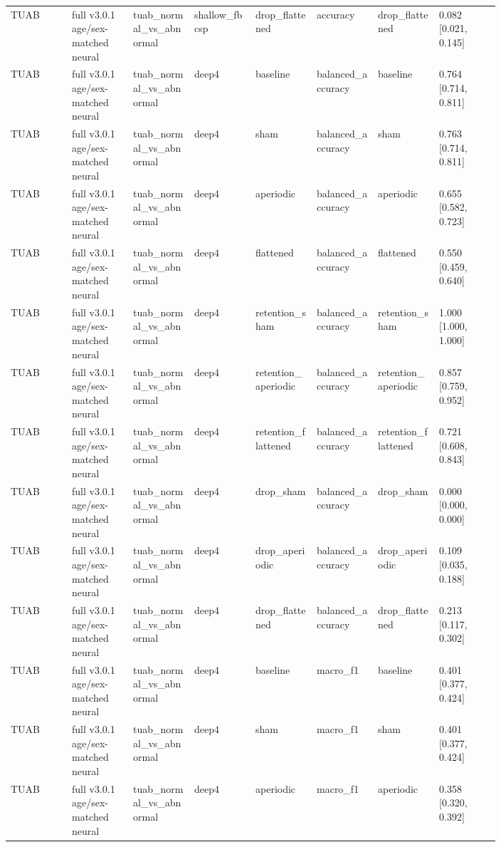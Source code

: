 \begin{longtable}{p{0.10\linewidth}p{0.10\linewidth}p{0.10\linewidth}p{0.10\linewidth}p{0.10\linewidth}p{0.10\linewidth}p{0.10\linewidth}p{0.10\linewidth}}
TUAB & full v3.0.1 age/sex-matched neural & tuab\_normal\_vs\_abnormal & shallow\_fbcsp & drop\_flattened & accuracy & drop\_flattened & 0.082 [0.021, 0.145]\\
TUAB & full v3.0.1 age/sex-matched neural & tuab\_normal\_vs\_abnormal & deep4 & baseline & balanced\_accuracy & baseline & 0.764 [0.714, 0.811]\\
TUAB & full v3.0.1 age/sex-matched neural & tuab\_normal\_vs\_abnormal & deep4 & sham & balanced\_accuracy & sham & 0.763 [0.714, 0.811]\\
TUAB & full v3.0.1 age/sex-matched neural & tuab\_normal\_vs\_abnormal & deep4 & aperiodic & balanced\_accuracy & aperiodic & 0.655 [0.582, 0.723]\\
TUAB & full v3.0.1 age/sex-matched neural & tuab\_normal\_vs\_abnormal & deep4 & flattened & balanced\_accuracy & flattened & 0.550 [0.459, 0.640]\\
TUAB & full v3.0.1 age/sex-matched neural & tuab\_normal\_vs\_abnormal & deep4 & retention\_sham & balanced\_accuracy & retention\_sham & 1.000 [1.000, 1.000]\\
TUAB & full v3.0.1 age/sex-matched neural & tuab\_normal\_vs\_abnormal & deep4 & retention\_aperiodic & balanced\_accuracy & retention\_aperiodic & 0.857 [0.759, 0.952]\\
TUAB & full v3.0.1 age/sex-matched neural & tuab\_normal\_vs\_abnormal & deep4 & retention\_flattened & balanced\_accuracy & retention\_flattened & 0.721 [0.608, 0.843]\\
TUAB & full v3.0.1 age/sex-matched neural & tuab\_normal\_vs\_abnormal & deep4 & drop\_sham & balanced\_accuracy & drop\_sham & 0.000 [0.000, 0.000]\\
TUAB & full v3.0.1 age/sex-matched neural & tuab\_normal\_vs\_abnormal & deep4 & drop\_aperiodic & balanced\_accuracy & drop\_aperiodic & 0.109 [0.035, 0.188]\\
TUAB & full v3.0.1 age/sex-matched neural & tuab\_normal\_vs\_abnormal & deep4 & drop\_flattened & balanced\_accuracy & drop\_flattened & 0.213 [0.117, 0.302]\\
TUAB & full v3.0.1 age/sex-matched neural & tuab\_normal\_vs\_abnormal & deep4 & baseline & macro\_f1 & baseline & 0.401 [0.377, 0.424]\\
TUAB & full v3.0.1 age/sex-matched neural & tuab\_normal\_vs\_abnormal & deep4 & sham & macro\_f1 & sham & 0.401 [0.377, 0.424]\\
TUAB & full v3.0.1 age/sex-matched neural & tuab\_normal\_vs\_abnormal & deep4 & aperiodic & macro\_f1 & aperiodic & 0.358 [0.320, 0.392]\\

\end{longtable}
